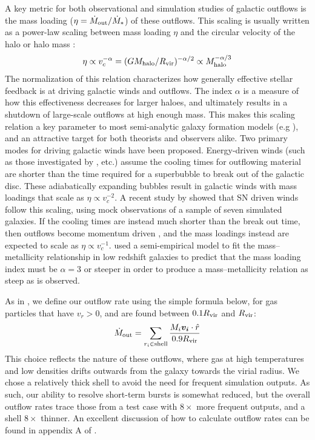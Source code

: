 A key metric for both observational and simulation studies of galactic outflows
is the mass loading ($\eta = \dot M_{\rm out} / \dot M_*$) of these outflows.  This
scaling is usually written as a power-law scaling between mass loading $\eta$
and the circular velocity of the halo or halo mass
\citep{Murray2005,Peeples2011}:
\begin{equation}
    \eta \propto v_c^{-\alpha} = (GM_{\rm halo}/R_{\rm vir})^{-\alpha/2} \propto
    M_{\rm halo}^{-\alpha/3}
\end{equation}
The normalization of this relation characterizes how generally effective stellar
feedback is at driving galactic winds and outflows.  The index $\alpha$ is a
measure of how this effectiveness decreases for larger haloes, and ultimately
results in a shutdown of large-scale outflows at high enough mass.  This makes
this scaling relation a key parameter to most semi-analytic galaxy formation
models (e.g \citet{Cole2000}), and an attractive target for both theorists and
observers alike.  Two primary modes for driving galactic winds have been
proposed.  Energy-driven winds (such as those investigated by
\citet{MacLow1988,Tegmark1993}, etc.) assume the cooling times for outflowing
material are shorter than the time required for a superbubble to break out of
the galactic disc.  These adiabatically expanding bubbles result in galactic
winds with mass loadings that scale as $\eta \propto v_c^{-2}$.  A recent study
by \citet{Christensen2016} showed that SN driven winds follow this scaling,
using mock observations of a sample of seven simulated galaxies.  If the cooling
times are instead much shorter than the break out time, then outflows become
momentum driven \citep{Murray2005}, and the mass loadings instead are expected
to scale as $\eta \propto v_c^{-1}$.  \citet{Peeples2011} used a semi-empirical
model to fit the mass--metallicity relationship in low redshift galaxies to
predict that the mass loading index must be $\alpha=3$ or steeper in order to
produce a mass--metallicity relation as steep as is observed.

As in \citet{Keller2015}, we define our outflow rate using the
simple formula below, for gas particles that have $v_r > 0$, and are found
between $0.1R_{\rm vir}$ and $R_{\rm vir}$:
\begin{equation}
    \dot M_{\rm out} = \sum_{r_i\in\mathrm{shell}}\frac{M_i \boldsymbol{v_i}\cdot\hat
    r}{0.9R_{\rm vir}}
    \label{halo_massflux}
\end{equation}
This choice reflects the nature of these outflows, where gas at high
temperatures and low densities drifts outwards from the galaxy towards
the virial radius.  We chose a relatively thick shell to avoid the need for
frequent simulation outputs.  As such, our ability to resolve short-term bursts
is somewhat reduced, but the overall outflow rates trace those from a test case
with $8\times$ more frequent outputs, and a shell $8\times$ thinner.  An
excellent discussion of how to calculate outflow rates can be found in appendix
A of \citet{Muratov2015}.

